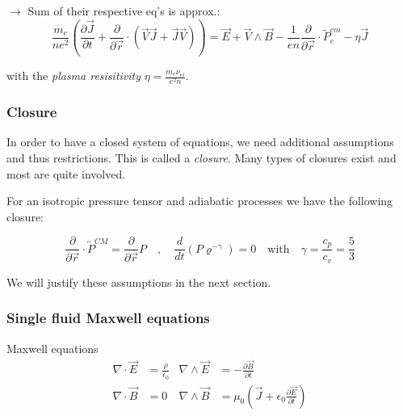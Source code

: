 $\to$ Sum of their respective eq's is approx.:
\[\frac{m_e}{n e^2} \left(\frac{\partial \vec{J}}{\partial t} + \frac{\partial}{\partial \vec{r}} \cdot (\vec{V}\vec{J} + \vec{J}\vec{V})\right) = \vec{E} + \vec{V} \wedge \vec{B} - \frac{1}{en} \frac{\partial}{\partial \vec{r}} \cdot \overleftrightarrow{P}_e^{cm} - \eta \vec{J}\]

with the \emph{plasma resisitivity} $\eta = \frac{m_e \nu_{ei}}{e^2 n} $.
\subsubsection{Closure}

In order to have a closed system of equations, we need additional assumptions and thus restrictions. This is called a \emph{closure}.
Many types of closures exist and most are quite involved.

For an isotropic pressure tensor and adiabatic processes we have the following closure:

\[
\frac{\partial}{\partial \vec{r}} \cdot \overleftrightarrow{P}^{CM} = \frac{\partial}{\partial \vec{r}} P \quad, \quad \frac{d}{dt} (P \varrho^{-\gamma}) = 0 \quad \text{with} \quad \gamma = \frac{c_p}{c_v}= \frac{5}{3}
\]

We will justify these assumptions in the next section.


\subsubsection{Single fluid Maxwell equations}
Maxwell equations
\begin{align*}
\nabla \cdot \vec{E} &= \frac{\rho}{\epsilon_0} & \nabla \wedge \vec{E} &= -\frac{\partial \vec{B}}{\partial t} \\
\nabla \cdot \vec{B} &= 0 & \nabla \wedge \vec{B} &= \mu_0 \left(\vec{J} + \epsilon_0 \frac{\partial \vec{E}}{\partial t}\right)
\end{align*}








